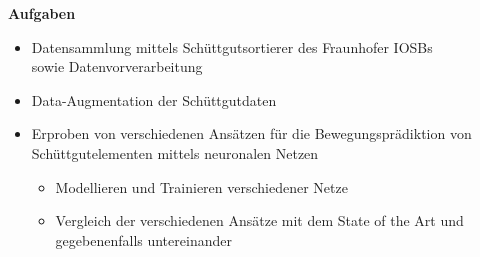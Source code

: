 \documentclass [a4paper, 10pt]{scrartcl}
\begin{document}
\textbf{Aufgaben}
\begin{itemize}
  \item Datensammlung mittels Schüttgutsortierer des Fraunhofer IOSBs \\sowie Datenvorverarbeitung 
  \item Data-Augmentation der Schüttgutdaten
  \item Erproben von verschiedenen Ansätzen für die Bewegungsprädiktion von Schüttgutelementen mittels neuronalen Netzen
  	\begin{itemize}
  		\item Modellieren und Trainieren verschiedener Netze
  		\item Vergleich der verschiedenen Ansätze mit dem State of the Art und gegebenenfalls untereinander
  	\end{itemize}
\end{itemize}
\Ende
\end{document}
